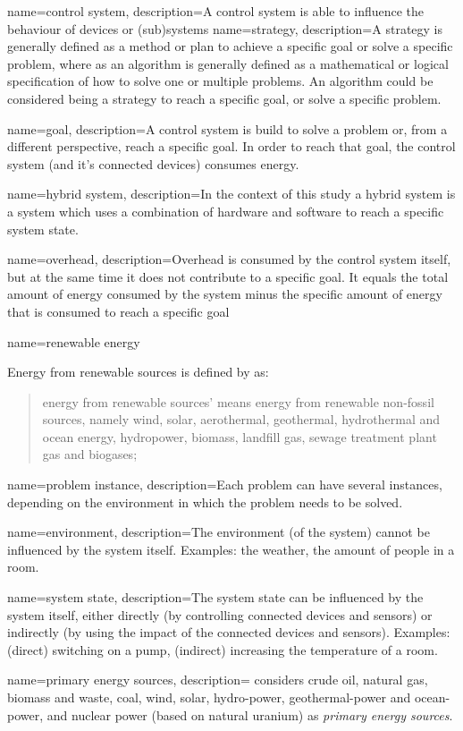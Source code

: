 \makeglossaries
\makeindex

{
name=control system,
description={A control system is able to influence the behaviour of devices or (sub)systems}
}
{
name=strategy,
description={A strategy is generally defined as a method or plan to achieve a specific goal or solve a specific problem, where as an algorithm is generally defined as a mathematical or logical specification of how to solve one or multiple problems. An algorithm could be considered being a strategy to reach a specific goal, or solve a specific problem.}
}

{
name=goal,
description={A control system is build to solve a problem or, from a different perspective, reach a specific goal. In order to reach that goal, the control system (and it's connected devices) consumes energy.}
}

{
name=hybrid system,
description={In the context of this study a hybrid system is a system which uses a combination of hardware and software to reach a specific system state.}
}

{
name=overhead,
description={Overhead is consumed by the control system itself, but at the same time it does not contribute to a specific goal. It equals the total amount of energy consumed by the system minus the specific amount of energy that is consumed to reach a specific goal}
}

{
name=renewable energy
}
{
Energy from renewable sources is defined by \cite{RE1} as: 
\begin{quote}energy from renewable sources’ means energy from renewable non-fossil sources, namely wind, solar, aerothermal, geothermal, hydrothermal and ocean energy, hydropower, biomass, landfill gas, sewage treatment plant gas and biogases;\end{quote}
}
{
name=problem instance,
description={Each problem can have several instances, depending on the environment in which the problem needs to be solved.}
}

{
name=environment,
description={The environment (of the system) cannot be influenced by the system itself. Examples: the weather, the amount of people in a room.}
}

{
name=system state,
description={The system state can be influenced by the system itself, either directly (by controlling connected devices and sensors) or indirectly (by using the impact of the connected devices and sensors). Examples: (direct) switching on a pump, (indirect) increasing the temperature of a room.}
}

{
name=primary energy sources,
description={\parencite{IM9} considers crude oil, natural gas, biomass and waste, coal, wind, solar, hydro-power, geothermal-power and ocean-power, and nuclear power (based on natural uranium) as \emph{primary energy sources}.}
}